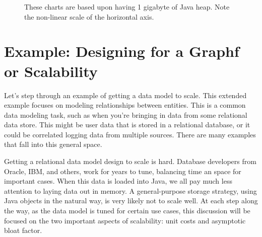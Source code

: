 \begin{figure}
   \caption{These charts are based upon having 1 gigabyte of Java heap. Note
   the non-linear scale of the horizontal axis.}
\end{figure}

\section{Example: Designing for a Graphf or Scalability}

Let's step through an example of getting a data model to scale. This extended
example focuses on modeling relationships between entities. This is a common
data modeling task, such as when you're bringing in data from some relational
data store. This might be user data that is stored in a relational database, or
it could be correlated logging data from multiple sources. There are many
examples that fall into this general space.

Getting a relational data model design to scale is hard. Database developers
from Oracle, IBM, and others, work for years to tune, balancing time an space
for important cases. When this data is loaded into Java, we all pay much less
attention to laying data out in memory. A general-purpose storage strategy,
using Java objects in the natural way, is very likely not to scale well.
At each step along the way, as the data model is tuned for certain use cases,
this discussion will be focused on the two important aspects of scalability:
unit costs and asymptotic bloat factor.

